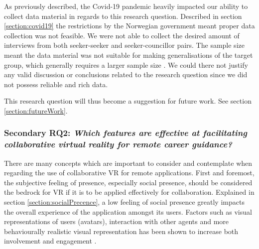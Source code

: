 As previously described, the Covid-19 pandemic heavily impacted our ability to collect data material in regards to this research question. Described in section \ref{section:covid19} the restrictions by the Norwegian government meant proper data collection was not feasible. We were not able to collect the desired amount of interviews from both seeker-seeker and seeker-councillor pairs. The sample size meant the data material was not suitable for making generalisations of the target group, which generally requires a larger sample size \cite{oates2005researching}. We could there not justify any valid discussion or conclusions related to the research question since we did not possess reliable and rich data.                

This research question will thus become a suggestion for future work. See section \ref{section:futureWork}.  




\subsubsection{Secondary RQ2: \textit{Which features are effective at facilitating collaborative virtual reality for remote
career guidance?}} 
There are many concepts which are important to consider and contemplate when regarding the use of collaborative VR for remote applications. First and foremost, the subjective feeling of presence, especially social presence, should be considered the bedrock for VR if it is to be applied effectively for collaboration. Explained in section \ref{section:socialPrecence}, a low feeling of social presence greatly impacts the overall experience of the application amongst its users. Factors such as visual representations of users (avatars), interaction with other agents and more behaviourally realistic visual representation has been shown to increase both involvement and engagement \cite{skalski2007role} \cite{oh2018systematic}. 

